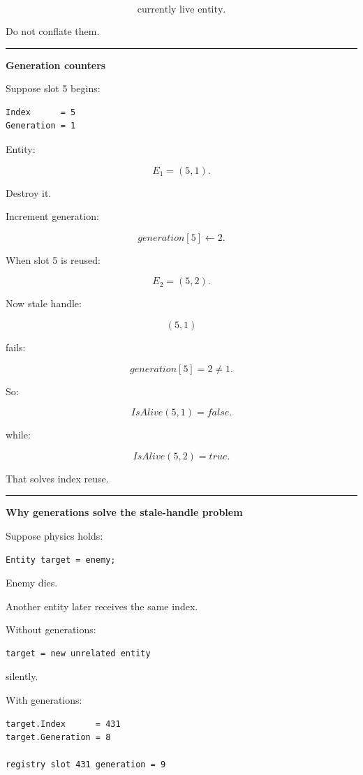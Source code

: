 \[
\boxed{
\text{currently live entity}
}.
\]

Do not conflate them.

\begin{center}\rule{0.5\linewidth}{0.5pt}\end{center}

\textbf{Generation counters}

Suppose slot 5 begins:

\begin{verbatim}
Index      = 5
Generation = 1
\end{verbatim}

Entity:

\[
E_1=(5,1).
\]

Destroy it.

Increment generation:

\[
generation[5]\leftarrow2.
\]

When slot 5 is reused:

\[
E_2=(5,2).
\]

Now stale handle:

\[
(5,1)
\]

fails:

\[
generation[5]=2\neq1.
\]

So:

\[
IsAlive(5,1)=false.
\]

while:

\[
IsAlive(5,2)=true.
\]

That solves index reuse.

\begin{center}\rule{0.5\linewidth}{0.5pt}\end{center}

\textbf{Why generations solve the stale-handle problem}

Suppose physics holds:

\begin{verbatim}
Entity target = enemy;
\end{verbatim}

Enemy dies.

Another entity later receives the same index.

Without generations:

\begin{verbatim}
target = new unrelated entity
\end{verbatim}

silently.

With generations:

\begin{verbatim}
target.Index      = 431
target.Generation = 8

registry slot 431 generation = 9
\end{verbatim}

